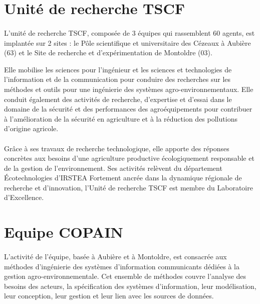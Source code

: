 \section{Unité de recherche TSCF}
\paragraph{}
L’unité de recherche \gls{TSCF}, composée de 3 équipes qui rassemblent 60 agents, est implantée sur 2 sites : le Pôle scientifique et universitaire des Cézeaux à Aubière (63) et le Site de recherche et d’expérimentation de Montoldre (03). 

Elle mobilise les sciences pour l’ingénieur et les sciences et technologies de l’information et de la communication pour conduire des recherches sur les méthodes et outils pour une ingénierie des systèmes agro-environnementaux. 
\newline
Elle conduit également des activités de recherche, d’expertise et d’essai dans le domaine de la sécurité et des performances des agroéquipements pour contribuer à l’amélioration de la sécurité en agriculture et à la réduction des pollutions d’origine agricole. 
\paragraph{}
Grâce à ses travaux de recherche technologique, elle apporte des réponses concrètes aux besoins d’une agriculture productive écologiquement responsable et de la gestion de l’environnement. Ses activités relèvent du département Écotechnologies d'IRSTEA 
\newline
Fortement ancrée dans la dynamique régionale de recherche et d’innovation, l’Unité de recherche TSCF est membre du Laboratoire d'Excellence. 

\section{Equipe \gls{COPAIN}}
\paragraph{}
L’activité de l’équipe, basée à Aubière et à Montoldre, est consacrée aux méthodes d’ingénierie des systèmes d’information communicants dédiées à la gestion agro-environnementale. Cet ensemble de méthodes couvre l’analyse des besoins des acteurs, la spécification des systèmes d’information, leur modélisation, leur conception, leur gestion et leur lien avec les sources de données. 
